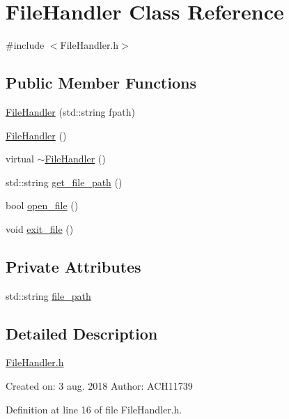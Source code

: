 \hypertarget{class_file_handler}{}\section{File\+Handler Class Reference}
\label{class_file_handler}


{\ttfamily \#include $<$File\+Handler.\+h$>$}

\subsection*{Public Member Functions}
\begin{DoxyCompactItemize}
\item 
\mbox{\hyperlink{class_file_handler_ab6dc27856e7eef893879d381d62dbc32}{File\+Handler}} (std\+::string fpath)
\item 
\mbox{\hyperlink{class_file_handler_a0d1ac8e9911e19255e8b2d99c2d93f43}{File\+Handler}} ()
\item 
virtual \mbox{\hyperlink{class_file_handler_a1ce10cd0ad31b313a8d526fba6f1e676}{$\sim$\+File\+Handler}} ()
\item 
std\+::string \mbox{\hyperlink{class_file_handler_ad3960a2c229347073f6ffc53e0ebceec}{get\+\_\+file\+\_\+path}} ()
\item 
bool \mbox{\hyperlink{class_file_handler_aefc9976ff2b2788298a65eba6d6d27a2}{open\+\_\+file}} ()
\item 
void \mbox{\hyperlink{class_file_handler_ab8bd470616da49ac3fc662f161db4b9b}{exit\+\_\+file}} ()
\end{DoxyCompactItemize}
\subsection*{Private Attributes}
\begin{DoxyCompactItemize}
\item 
std\+::string \mbox{\hyperlink{class_file_handler_a1683e00c3112530e697703c327e21c9b}{file\+\_\+path}}
\end{DoxyCompactItemize}


\subsection{Detailed Description}
\mbox{\hyperlink{_file_handler_8h}{File\+Handler.\+h}}

Created on\+: 3 aug. 2018 Author\+: A\+C\+H11739 

Definition at line 16 of file File\+Handler.\+h.



